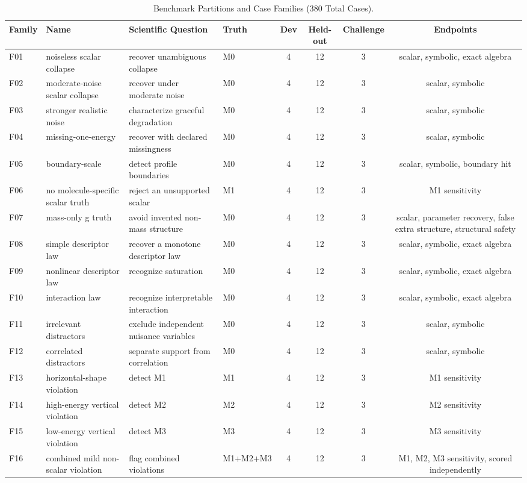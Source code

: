 \begin{table}[t]
\centering
\small
\caption{Benchmark Partitions and Case Families (380 Total Cases).}
\label{tab:case_families}
\begin{tabular}{llllcccc}
\toprule
Family & Name & Scientific Question & Truth & Dev & Held-out & Challenge & Endpoints \\
\midrule
F01 & noiseless scalar collapse & recover unambiguous collapse & M0 & 4 & 12 & 3 & scalar, symbolic, exact algebra \\
F02 & moderate-noise scalar collapse & recover under moderate noise & M0 & 4 & 12 & 3 & scalar, symbolic \\
F03 & stronger realistic noise & characterize graceful degradation & M0 & 4 & 12 & 3 & scalar, symbolic \\
F04 & missing-one-energy & recover with declared missingness & M0 & 4 & 12 & 3 & scalar, symbolic \\
F05 & boundary-scale & detect profile boundaries & M0 & 4 & 12 & 3 & scalar, symbolic, boundary hit \\
F06 & no molecule-specific scalar truth & reject an unsupported scalar & M1 & 4 & 12 & 3 & M1 sensitivity \\
F07 & mass-only g truth & avoid invented non-mass structure & M0 & 4 & 12 & 3 & scalar, parameter recovery, false extra structure, structural safety \\
F08 & simple descriptor law & recover a monotone descriptor law & M0 & 4 & 12 & 3 & scalar, symbolic, exact algebra \\
F09 & nonlinear descriptor law & recognize saturation & M0 & 4 & 12 & 3 & scalar, symbolic, exact algebra \\
F10 & interaction law & recognize interpretable interaction & M0 & 4 & 12 & 3 & scalar, symbolic, exact algebra \\
F11 & irrelevant distractors & exclude independent nuisance variables & M0 & 4 & 12 & 3 & scalar, symbolic \\
F12 & correlated distractors & separate support from correlation & M0 & 4 & 12 & 3 & scalar, symbolic \\
F13 & horizontal-shape violation & detect M1 & M1 & 4 & 12 & 3 & M1 sensitivity \\
F14 & high-energy vertical violation & detect M2 & M2 & 4 & 12 & 3 & M2 sensitivity \\
F15 & low-energy vertical violation & detect M3 & M3 & 4 & 12 & 3 & M3 sensitivity \\
F16 & combined mild non-scalar violation & flag combined violations & M1+M2+M3 & 4 & 12 & 3 & M1, M2, M3 sensitivity, scored independently \\

\end{tabular}
\end{table}
